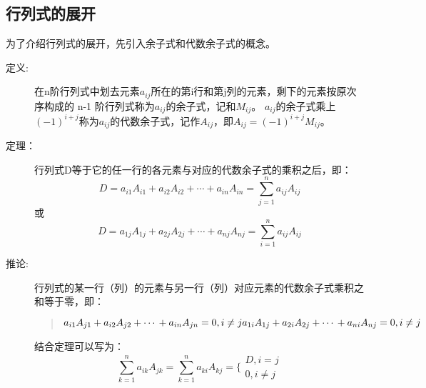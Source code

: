\documentclass[a4paper,10pt]{article}
\begin{document}
\begin{CJK}{UTF8}{song}
\subsection{行列式的展开}
为了介绍行列式的展开，先引入余子式和代数余子式的概念。
\begin{description}
\item[定义:] 在n阶行列式中划去元素$a_{ij}$所在的第i行和第j列的元素，剩下的元素按原次序构成的 n-1 阶行列式称为$a_{ij}$的余子式，记和$M_{ij}$。
$a_{ij}$的余子式乘上$(-1)^{i+j}$称为$a_{ij}$的代数余子式，记作$A_{ij}$，即$A_{ij}=(-1)^{i+j}M_{ij}$。
\item[定理：] 行列式D等于它的任一行的各元素与对应的代数余子式的乘积之后，即：
\begin{displaymath}
D=a_{i1}A_{i1}+a_{i2}A_{i2}+\cdots{}+a_{in}A_{in}=\sum_{j=1}^{n}a_{ij}A_{ij} 
\end{displaymath}
或
\begin{displaymath}
D=a_{1j}A_{1j}+a_{2j}A_{2j}+\cdots{}+a_{nj}A_{nj}=\sum_{i=1}^{n}a_{ij}A_{ij}
\end{displaymath}
\item[推论:] 行列式的某一行（列）的元素与另一行（列）对应元素的代数余子式乘积之和等于零，即：
\begin{quote}
\begin{math}
a_{i1}A_{j1}+a_{i2}A_{j2}+\cdots{}+a_{in}A_{jn}=0, i\neq{}j \\
a_{1i}A_{1j}+a_{2i}A_{2j}+\cdots{}+a_{ni}A_{nj}=0, i\neq{}j
\end{math}
\end{quote}
结合定理可以写为：
\begin{displaymath}
\sum_{k=1}^{n}a_{ik}A_{jk}=\sum_{k=1}^{n}a_{ki}A_{kj}=
\biggl\{ \begin{array}{c}
D,i=j \\
0,i\neq{}j 
\end{array} 
\end{displaymath}
\end{description}

\end{CJK}
\end{document}
